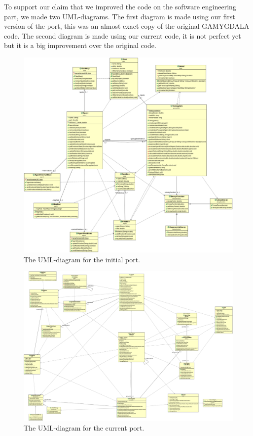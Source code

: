 To support our claim that we improved the code on the software engineering part, we made two UML-diagrams. The first diagram is made using our first version of the port, this was an almost exact copy of the original GAMYGDALA code. The second diagram is made using our current code, it is not perfect yet but it is a big improvement over the original code. \\

\begin{figure}
\includegraphics[width=\linewidth]{GAMYGDALA_UML_OLD}
\caption{The UML-diagram for the initial port.}
\end{figure}

\begin{figure}
\includegraphics[width=\linewidth]{GAMYGDALA_UML_NEW}
\caption{The UML-diagram for the current port.}
\end{figure}